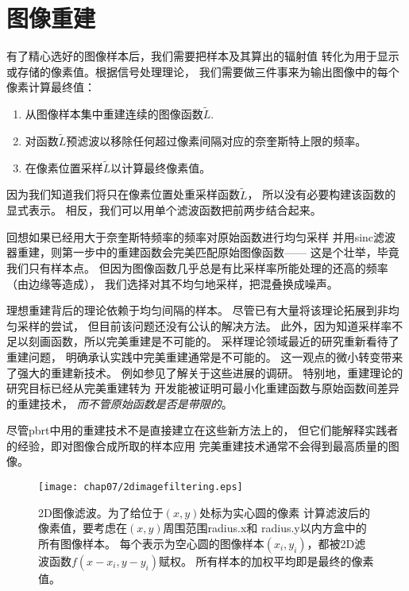 \section{图像重建}\label{sec:图像重建}
有了精心选好的图像样本后，我们需要把样本及其算出的辐射值
转化为用于显示或存储的像素值。根据信号处理理论，
我们需要做三件事来为输出图像中的每个像素计算最终值：
\begin{enumerate}
    \item 从图像样本集中重建连续的图像函数$\tilde{L}$.
    \item 对函数$\tilde{L}$预滤波以移除任何超过像素间隔对应的奈奎斯特上限的频率。
    \item 在像素位置采样$\tilde{L}$以计算最终像素值。
\end{enumerate}

因为我们知道我们将只在像素位置处重采样函数$\tilde{L}$，
所以没有必要构建该函数的显式表示。
相反，我们可以用单个滤波函数把前两步结合起来。

回想如果已经用大于奈奎斯特频率的频率对原始函数进行均匀采样
并用sinc滤波器重建，则第一步中的重建函数会完美匹配原始图像函数——
这是个壮举，毕竟我们只有样本点。
但因为图像函数几乎总是有比采样率所能处理的还高的频率（由边缘等造成），
我们选择对其不均匀地采样，把混叠换成噪声。

理想重建背后的理论依赖于均匀间隔的样本。
尽管已有大量将该理论拓展到非均匀采样的尝试，
但目前该问题还没有公认的解决方法。
此外，因为知道采样率不足以刻画函数，所以完美重建是不可能的。
采样理论领域最近的研究重新看待了重建问题，
明确承认实践中完美重建通常是不可能的。
这一观点的微小转变带来了强大的重建新技术。
例如参见\citet{843002}了解关于这些进展的调研。
特别地，重建理论的研究目标已经从完美重建转为
开发能被证明可最小化重建函数与原始函数间差异的重建技术，
\emph{而不管原始函数是否是带限的}。

尽管pbrt中用的重建技术不是直接建立在这些新方法上的，
但它们能解释实践者的经验，即对图像合成所取的样本应用
完美重建技术通常不会得到最高质量的图像。
\begin{figure}[htbp]
    \centering\texttt{[image: chap07/2dimagefiltering.eps]}
    \caption{2D图像滤波。为了给位于$(x,y)$处标为实心圆的像素
    计算滤波后的像素值，要考虑在$(x,y)$周围范围{\ttfamily radius.x}和
    {\ttfamily radius.y}以内方盒中的所有图像样本。
    每个表示为空心圆的图像样本$(x_i,y_i)$，都被2D滤波函数$f(x-x_i,y-y_i)$赋权。
    所有样本的加权平均即是最终的像素值。}
    \label{fig:7.38}
\end{figure}

